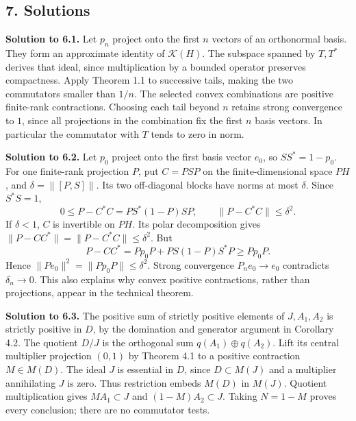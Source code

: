 \documentclass[
  11pt,
]{article}
\begin{document}
\subsection{7. Solutions}\label{solutions}

\textbf{Solution to 6.1.} Let \(p_n\) project onto the first \(n\)
vectors of an orthonormal basis. They form an approximate identity of
\(\mathcal K(H)\). The subspace spanned by \(T,T^*\) derives that ideal,
since multiplication by a bounded operator preserves compactness. Apply
Theorem 1.1 to successive tails, making the two commutators smaller than
\(1/n\). The selected convex combinations are positive finite-rank
contractions. Choosing each tail beyond \(n\) retains strong convergence
to \(1\), since all projections in the combination fix the first \(n\)
basis vectors. In particular the commutator with \(T\) tends to zero in
norm.

\textbf{Solution to 6.2.} Let \(p_0\) project onto the first basis
vector \(e_0\), so \(SS^*=1-p_0\). For one finite-rank projection \(P\),
put \(C=PSP\) on the finite-dimensional space \(PH\), and
\(\delta=\|[P,S]\|\). Its two off-diagonal blocks have norms at most
\(\delta\). Since \(S^*S=1\), \[
0\leq P-C^*C=PS^*(1-P)SP,\qquad
\|P-C^*C\|\leq\delta^2.
\tag{7.1}
\] If \(\delta<1\), \(C\) is invertible on \(PH\). Its polar
decomposition gives \(\|P-CC^*\|=\|P-C^*C\|\leq\delta^2\). But \[
P-CC^*
=Pp_0P+PS(1-P)S^*P\geq Pp_0P.
\tag{7.2}
\] Hence \(\|Pe_0\|^2=\|Pp_0P\|\leq\delta^2\). Strong convergence
\(P_ne_0\to e_0\) contradicts \(\delta_n\to0\). This also explains why
convex positive contractions, rather than projections, appear in the
technical theorem.

\textbf{Solution to 6.3.} The positive sum of strictly positive elements
of \(J,A_1,A_2\) is strictly positive in \(D\), by the domination and
generator argument in Corollary 4.2. The quotient \(D/J\) is the
orthogonal sum \(q(A_1)\oplus q(A_2)\). Lift its central multiplier
projection \((0,1)\) by Theorem 4.1 to a positive contraction
\(M\in M(D)\). The ideal \(J\) is essential in \(D\), since
\(D\subset M(J)\) and a multiplier annihilating \(J\) is zero. Thus
restriction embeds \(M(D)\) in \(M(J)\). Quotient multiplication gives
\(MA_1\subset J\) and \((1-M)A_2\subset J\). Taking \(N=1-M\) proves
every conclusion; there are no commutator tests.
\end{document}

